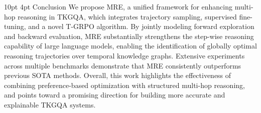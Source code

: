 \documentclass[letterpaper]{article} %
\makeatletter
\renewcommand{\section}{%
  \@startsection{section}{1}{\z@}%
  {10pt} %
  {4pt}  %
  {\centering\bfseries\large}%
}
\makeatother
\begin{document}
\section{Conclusion}
We propose MRE, a unified framework for enhancing multi-hop reasoning in TKGQA, which integrates trajectory sampling, supervised fine-tuning, and a novel T-GRPO algorithm. By jointly modeling forward exploration and backward evaluation, MRE substantially strengthens the step-wise reasoning capability of large language models, enabling the identification of globally optimal reasoning trajectories over temporal knowledge graphs. Extensive experiments across multiple benchmarks demonstrate that MRE consistently outperforms previous SOTA methods. Overall, this work highlights the effectiveness of combining preference-based optimization with structured multi-hop reasoning, and points toward a promising direction for building more accurate and explainable TKGQA systems.




\end{document}
